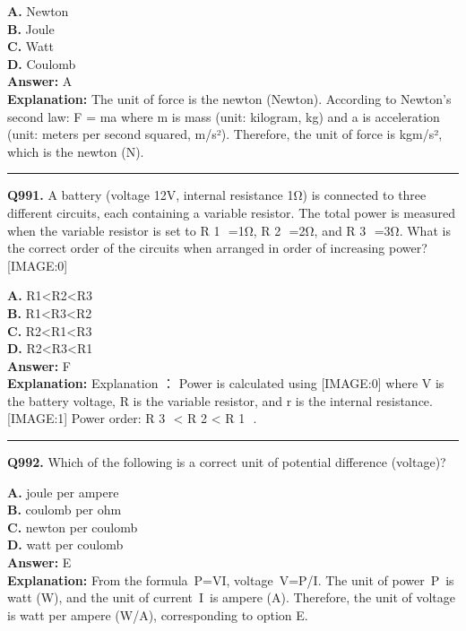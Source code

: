\documentclass[12pt]{article}
\begin{document}
\textbf{A.} Newton \\
\textbf{B.} Joule \\
\textbf{C.} Watt \\
\textbf{D.} Coulomb \\

\textbf{Answer:} A \\
\textbf{Explanation:} The unit of force is the newton (Newton). According to Newton's second law:
F
=
ma
where
m
is mass (unit: kilogram, kg) and
a
is acceleration (unit: meters per second squared, m/s²). Therefore, the unit of force is kg\cdot m/s², which is the newton (N).

\hrule
\vspace{1em}


\noindent
\textbf{Q991.} A battery (voltage 12V, internal resistance 1Ω) is connected to three different circuits, each containing a variable resistor. The total power is measured when the variable resistor is set to
R
1
​
=1Ω,
R
2
​
=2Ω, and
R
3
​
=3Ω. What is the correct order of the circuits when arranged in order of increasing power?
[IMAGE:0]



\textbf{A.} R1<R2<R3 \\
\textbf{B.} R1<R3<R2 \\
\textbf{C.} R2<R1<R3 \\
\textbf{D.} R2<R3<R1 \\

\textbf{Answer:} F \\
\textbf{Explanation:} Explanation
：
Power is calculated using
[IMAGE:0]
where
V
is the battery voltage,
R
is the variable resistor, and
r
is the internal resistance.
[IMAGE:1]
Power order:
R
3
​
<
R
2
​
<
R
1
​
.

\hrule
\vspace{1em}


\noindent
\textbf{Q992.} Which of the following is a correct unit of potential difference (voltage)?



\textbf{A.} joule per ampere \\
\textbf{B.} coulomb per ohm \\
\textbf{C.} newton per coulomb \\
\textbf{D.} watt per coulomb \\

\textbf{Answer:} E \\
\textbf{Explanation:} From the formula P=VI, voltage V=P/I​. The unit of power P is watt (W), and the unit of current I is ampere (A). Therefore, the unit of voltage is watt per ampere (W/A), corresponding to option E.
\end{document}
